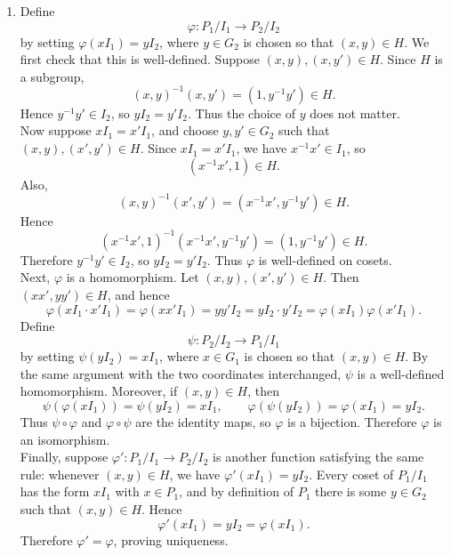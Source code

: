 \documentclass[../Odyssey_Project.tex]{subfiles}
\begin{document}
\begin{solution}
\begin{enumerate}
        \item[(b)] Define
    \[
        \varphi \colon P_1/I_1 \to P_2/I_2
    \]
    by setting $\varphi(xI_1) = yI_2$, where $y \in G_2$ is chosen so that $(x,y) \in H$. We first check that this is well-defined. Suppose $(x,y),(x,y') \in H$. Since $H$ is a subgroup,
    \[
        (x,y)^{-1}(x,y') = (1,y^{-1}y') \in H.
    \]
    Hence $y^{-1}y' \in I_2$, so $yI_2 = y'I_2$. Thus the choice of $y$ does not matter. \\
    Now suppose $xI_1 = x'I_1$, and choose $y,y' \in G_2$ such that $(x,y),(x',y') \in H$. Since $xI_1 = x'I_1$, we have $x^{-1}x' \in I_1$, so
    \[
        (x^{-1}x',1) \in H.
    \]
    Also,
    \[
        (x,y)^{-1}(x',y') = (x^{-1}x',y^{-1}y') \in H.
    \]
    Hence
    \[
        (x^{-1}x',1)^{-1}(x^{-1}x',y^{-1}y') = (1,y^{-1}y') \in H.
    \]
    Therefore $y^{-1}y' \in I_2$, so $yI_2 = y'I_2$. Thus $\varphi$ is well-defined on cosets. \\
    Next, $\varphi$ is a homomorphism. Let $(x,y),(x',y') \in H$. Then $(xx',yy') \in H$, and hence
    \[
        \varphi(xI_1 \cdot x'I_1)
        =
        \varphi(xx'I_1)
        =
        yy'I_2
        =
        yI_2 \cdot y'I_2
        =
        \varphi(xI_1)\varphi(x'I_1).
    \]
    Define
    \[
        \psi \colon P_2/I_2 \to P_1/I_1
    \]
    by setting $\psi(yI_2) = xI_1$, where $x \in G_1$ is chosen so that $(x,y) \in H$. By the same argument with the two coordinates interchanged, $\psi$ is a well-defined homomorphism. Moreover, if $(x,y) \in H$, then
    \[
        \psi(\varphi(xI_1)) = \psi(yI_2) = xI_1,
        \qquad
        \varphi(\psi(yI_2)) = \varphi(xI_1) = yI_2.
    \]
    Thus $\psi \circ \varphi$ and $\varphi \circ \psi$ are the identity maps, so $\varphi$ is a bijection. Therefore $\varphi$ is an isomorphism. \\
    Finally, suppose $\varphi' \colon P_1/I_1 \to P_2/I_2$ is another function satisfying the same rule: whenever $(x,y) \in H$, we have $\varphi'(xI_1) = yI_2$. Every coset of $P_1/I_1$ has the form $xI_1$ with $x \in P_1$, and by definition of $P_1$ there is some $y \in G_2$ such that $(x,y) \in H$. Hence
    \[
        \varphi'(xI_1) = yI_2 = \varphi(xI_1).
    \]
    Therefore $\varphi' = \varphi$, proving uniqueness.


\end{enumerate}
\end{solution}
\end{document}
